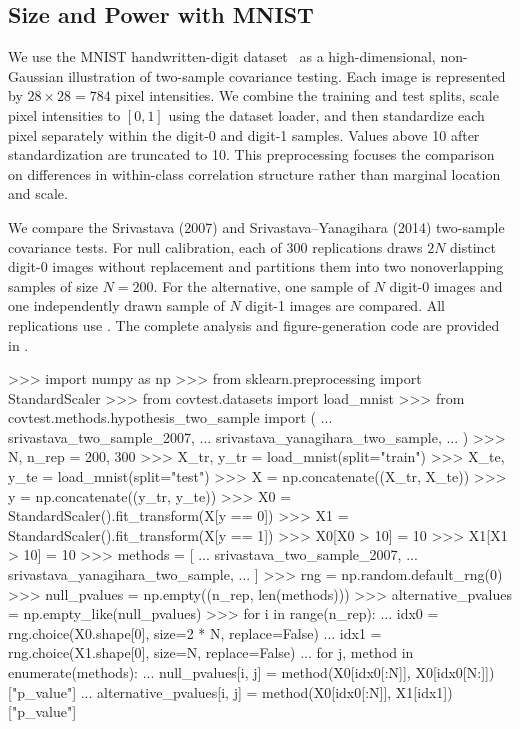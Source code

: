 \subsection{Size and Power with MNIST}
\label{sec:mnist-example}

We use the MNIST handwritten-digit dataset~\citep{lecun2002gradient} as a
high-dimensional, non-Gaussian illustration of two-sample covariance testing.
Each image is represented by $28 \times 28 = 784$ pixel intensities. We combine
the training and test splits, scale pixel intensities to $[0,1]$ using the
dataset loader, and then standardize each pixel separately within the digit-0
and digit-1 samples. Values above 10 after standardization are truncated to
10. This preprocessing focuses the comparison on differences in within-class
correlation structure rather than marginal location and scale.

We compare the Srivastava (2007) and Srivastava--Yanagihara (2014) two-sample
covariance tests. For null calibration, each of 300 replications draws $2N$
distinct digit-0 images without replacement and partitions them into two
nonoverlapping samples of size $N = 200$. For the alternative, one sample of
$N$ digit-0 images and one independently drawn sample of $N$ digit-1 images
are compared. All replications use . The
complete analysis and figure-generation code are provided in
.

\begin{CodeChunk}
\begin{CodeInput}
>>> import numpy as np
>>> from sklearn.preprocessing import StandardScaler
>>> from covtest.datasets import load_mnist
>>> from covtest.methods.hypothesis_two_sample import (
...     srivastava_two_sample_2007,
...     srivastava_yanagihara_two_sample,
... )
>>> N, n_rep = 200, 300
>>> X_tr, y_tr = load_mnist(split="train")
>>> X_te, y_te = load_mnist(split="test")
>>> X = np.concatenate((X_tr, X_te))
>>> y = np.concatenate((y_tr, y_te))
>>> X0 = StandardScaler().fit_transform(X[y == 0])
>>> X1 = StandardScaler().fit_transform(X[y == 1])
>>> X0[X0 > 10] = 10
>>> X1[X1 > 10] = 10
>>> methods = [
...     srivastava_two_sample_2007,
...     srivastava_yanagihara_two_sample,
... ]
>>> rng = np.random.default_rng(0)
>>> null_pvalues = np.empty((n_rep, len(methods)))
>>> alternative_pvalues = np.empty_like(null_pvalues)
>>> for i in range(n_rep):
...     idx0 = rng.choice(X0.shape[0], size=2 * N, replace=False)
...     idx1 = rng.choice(X1.shape[0], size=N, replace=False)
...     for j, method in enumerate(methods):
...         null_pvalues[i, j] = method(X0[idx0[:N]], X0[idx0[N:]])["p_value"]
...         alternative_pvalues[i, j] = method(X0[idx0[:N]], X1[idx1])["p_value"]
\end{CodeInput}
\end{CodeChunk}

